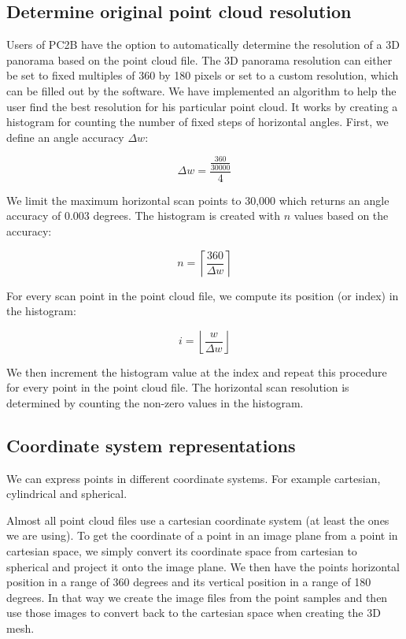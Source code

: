\subsection{Determine original point cloud resolution}

Users of PC2B have the option to automatically determine the resolution of a 3D panorama based on the point cloud file. The 3D panorama resolution can either be set to fixed multiples of 360 by 180 pixels or set to a custom resolution, which can be filled out by the software. We have implemented an algorithm to help the user find the best resolution for his particular point cloud. It works by creating a histogram for counting the number of fixed steps of horizontal angles. First, we define an angle accuracy $\Delta{w}$:

$$ \Delta{w}=  \frac{\frac{360}{30000}}{4} $$

We limit the maximum horizontal scan points to 30,000 which returns an angle accuracy of 0.003 degrees. The histogram is created with $n$ values based on the accuracy:

$$ n = \left\lceil \frac{360}{ \Delta{w} } \right\rceil $$

For every scan point in the point cloud file, we compute its position (or index) in the histogram:

$$ i = \left\lfloor \frac{w}{ \Delta{w} } \right\rfloor $$

We then increment the histogram value at the index and repeat this procedure for every point in the point cloud file. The horizontal scan resolution is determined by counting the non-zero values in the histogram.


\subsection{Coordinate system representations}

We can express points in different coordinate systems. For example cartesian, cylindrical and spherical.

Almost all point cloud files use a cartesian coordinate system (at least the ones we are using). To get the coordinate of a point in an image plane from a point in cartesian space, we simply convert its coordinate space from cartesian to spherical and project it onto the image plane. We then have the points horizontal position in a range of 360 degrees and its vertical position in a range of 180 degrees. In that way we create the image files from the point samples and then use those images to convert back to the cartesian space when creating the 3D mesh.

